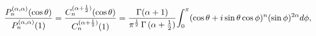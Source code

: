 \[{\frac{\mathop{P^{(\alpha,\alpha)}_{n}\/}\nolimits\!\left(\mathop{\cos\/}%
\nolimits\theta\right)}{\mathop{P^{(\alpha,\alpha)}_{n}\/}\nolimits\!\left(1%
\right)}=\frac{\mathop{C^{(\alpha+\frac{1}{2})}_{n}\/}\nolimits\!\left(\mathop%
{\cos\/}\nolimits\theta\right)}{\mathop{C^{(\alpha+\frac{1}{2})}_{n}\/}%
\nolimits\!\left(1\right)}}=\frac{\mathop{\Gamma\/}\nolimits\!\left(\alpha+1%
\right)}{\pi^{\frac{1}{2}}\mathop{\Gamma\/}\nolimits{(\alpha+\tfrac{1}{2})}}\*%
{\int_{0}^{\pi}(\mathop{\cos\/}\nolimits\theta+i\mathop{\sin\/}\nolimits\theta%
\mathop{\cos\/}\nolimits\phi)^{n}\*(\mathop{\sin\/}\nolimits\phi)^{2\alpha}d%
\phi},\]